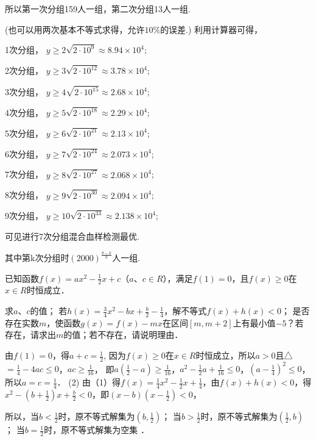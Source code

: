 \documentclass[cs4size,windows,a4paper,answers]{BHCexam}
\begin{document}
\begin{groups}
\begin{questions}[s]
\begin{solution}
所以第一次分组159人一组，第二次分组13人一组.

(也可以用两次基本不等式求得，允许$10\%$的误差.)
利用计算器可得，

1次分组， $y \ge 2\sqrt{2\cdot 10^9}\approx8.94\times10^4$;

2次分组， $y \ge 3\sqrt{2\cdot 10^{12}}\approx3.78\times10^4$;

3次分组， $y \ge 4\sqrt{2\cdot 10^{15}}\approx2.68\times10^4$;

4次分组， $y \ge 5\sqrt{2\cdot 10^{18}}\approx2.29\times10^4$;

5次分组， $y \ge 6\sqrt{2\cdot 10^{21}}\approx2.13\times10^4$;

6次分组， $y \ge 7\sqrt{2\cdot 10^{24}}\approx2.073\times10^4$;

7次分组， $y \ge 8\sqrt{2\cdot 10^{27}}\approx2.068\times10^4$;

8次分组， $y \ge 9\sqrt{2\cdot 10^{30}}\approx2.094\times10^4$;

9次分组， $y \ge 10\sqrt{2\cdot 10^{33}}\approx2.138\times10^4$;

可见进行7次分组混合血样检测最优.

其中第k次分组时$(2000)^{\frac{8-k}{8}}$人一组.


\end{solution}
\question[18] 已知函数$f(x)=a{{x}^{2}}-\frac{1}{2}x+c$（$a$、$c\in R$），满足$f(1)=0$，且$f(x)\ge 0$在$x\in R$时恒成立．
\begin{subquestions}
    \subquestion 求$a$、$c$的值；
    \subquestion 若$h(x)=\frac{3}{4}{{x}^{2}}-bx+\frac{b}{2}-\frac{1}{4}$，解不等式$f(x)+h(x)<0$；
    \subquestion 是否存在实数$m$，使函数$g(x)=f(x)-mx$在区间$[m,m+2]$上有最小值$-5$？若存在，请求出$m$的值；若不存在，请说明理由．

\end{subquestions}
\begin{solution}
\methodonly
由$f(1)=0$，得$a+c=\frac{1}{2}$,
因为$f(x)\ge 0$在$x\in R$时恒成立，所以$a>0$且△$=\frac{1}{4}-4ac\le 0$，$ac\ge \frac{1}{16}$，
即$a\left( \frac{1}{2}-a \right)\ge \frac{1}{16}$，${{a}^{2}}-\frac{1}{2}a+\frac{1}{16}\le 0$，${{\left( a-\frac{1}{4} \right)}^{2}}\le 0$，所以$a=c=\frac{1}{4}$．
(2) 由（1）得$f(x)=\frac{1}{4}{{x}^{2}}-\frac{1}{2}x+\frac{1}{4}$，由$f(x)+h(x)<0$，得
${{x}^{2}}-\left( b+\frac{1}{2} \right)x+\frac{b}{2}<0$，即$(x-b)\left( x-\frac{1}{2} \right)<0$，

所以，当$b<\frac{1}{2}$时，原不等式解集为$(b,\frac{1}{2})$；
当$b>\frac{1}{2}$时，原不等式解集为$(\frac{1}{2},b)$；
当$b=\frac{1}{2}$时，原不等式解集为空集 ．


\end{solution}
\end{questions}
\end{groups}
\end{document}
